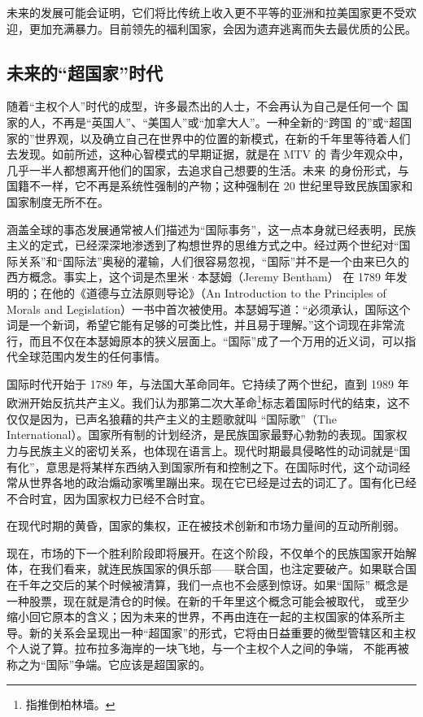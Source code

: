 未来的发展可能会证明，它们将比传统上收入更不平等的亚洲和拉美国家更不受欢迎，更加充满暴力。目前领先的福利国家，会因为遗弃逃离而失去最优质的公民。

\subsection{未来的“超国家”时代}

随着“主权个人”时代的成型，许多最杰出的人士，不会再认为自己是任何一个 国家的人，不再是“英国人”、“美国人”或“加拿大人”。一种全新的“跨国 的”或“超国家的”世界观，以及确立自己在世界中的位置的新模式，在新的千年里等待着人们去发现。如前所述，这种心智模式的早期证据，就是在 MTV 的 青少年观众中，几乎一半人都想离开他们的国家，去追求自己想要的生活。未来 的身份形式，与国籍不一样，它不再是系统性强制的产物；这种强制在 20 世纪里导致民族国家和国家制度无所不在。

涵盖全球的事态发展通常被人们描述为“国际事务”，这一点本身就已经表明，民族主义的定式，已经深深地渗透到了构想世界的思维方式之中。经过两个世纪对“国际关系”和“国际法”奥秘的灌输，人们很容易忽视，“国际”并不是一个由来已久的西方概念。事实上，这个词是杰里米·本瑟姆（Jeremy Bentham） 在 1789 年发明的；在他的《道德与立法原则导论》（An Introduction to the Principles of  Morals and Legislation）一书中首次被使用。本瑟姆写道：“必须承认，国际这个词是一个新词，希望它能有足够的可类比性，并且易于理解。”这个词现在非常流行，而且不仅在本瑟姆原本的狭义层面上。“国际”成了一个万用的近义词，可以指代全球范围内发生的任何事情。

国际时代开始于 1789 年，与法国大革命同年。它持续了两个世纪，直到 1989 年欧洲开始反抗共产主义。我们认为那第二次大革命\footnote{指推倒柏林墙。}标志着国际时代的结束，这不仅仅是因为，已声名狼藉的共产主义的主题歌就叫 “国际歌”（The International）。国家所有制的计划经济，是民族国家最野心勃勃的表现。国家权力与民族主义的密切关系，也体现在语言上。现代时期最具侵略性的动词就是“国有化”，意思是将某样东西纳入到国家所有和控制之下。在国际时代，这个动词经常从世界各地的政治煽动家嘴里蹦出来。现在它已经是过去的词汇了。国有化已经不合时宜，因为国家权力已经不合时宜。

在现代时期的黄昏，国家的集权，正在被技术创新和市场力量间的互动所削弱。

现在，市场的下一个胜利阶段即将展开。在这个阶段，不仅单个的民族国家开始解体，在我们看来，就连民族国家的俱乐部——联合国，也注定要破产。如果联合国在千年之交后的某个时候被清算，我们一点也不会感到惊讶。如果“国际” 概念是一种股票，现在就是清仓的时候。在新的千年里这个概念可能会被取代， 或至少缩小回它原本的含义；因为未来的世界，不再由连在一起的主权国家的体系所主导。新的关系会呈现出一种“超国家”的形式，它将由日益重要的微型管辖区和主权个人说了算。拉布拉多海岸的一块飞地，与一个主权个人之间的争端， 不能再被称之为“国际”争端。它应该是超国家的。

